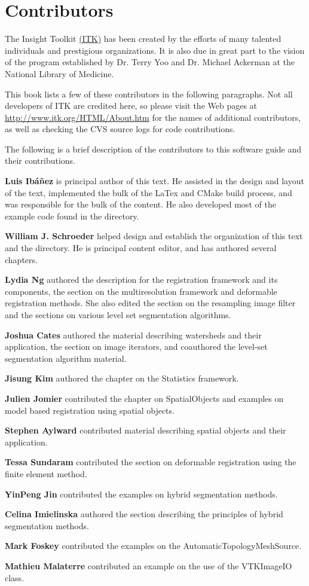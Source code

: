 \chapter*{Contributors}
\noindent

The Insight Toolkit \href{http://www.itk.org}{(ITK)} has been created by the
efforts of many talented individuals and prestigious organizations. It is also
due in great part to the vision of the program established by Dr. Terry Yoo
and Dr. Michael Ackerman at the National Library of Medicine.

This book lists a few of these contributors in the following paragraphs. Not
all developers of ITK are credited here, so please visit the Web pages at
\href{http://www.itk.org/HTML/About.htm}{http://www.itk.org/HTML/About.htm} 
for the names of additional contributors, as well as checking the CVS source
logs for code contributions.

The following is a brief description of the contributors to this software
guide and their contributions.

{\bf Luis Ib\'{a}\~{n}ez} is principal author of this text.
He assisted in the design and layout of the text, implemented the bulk of
the LaTex and CMake build process, and was responsible for the bulk of 
the content. He also developed most of the example code found in the
 directory.

{\bf William J. Schroeder} helped design and establish the organization 
of this text and the  directory. He is principal 
content editor, and has authored several chapters.

{\bf Lydia Ng} authored the description for the registration framework and
its components, the section on the multiresolution framework and deformable
registration methods. She also edited the section on the resampling image
filter and the sections on various level set segmentation algorithms.

{\bf Joshua Cates} authored the material describing watersheds and their
application, the section on image iterators, and coauthored the level-set 
segmentation algorithm material.

{\bf Jisung Kim} authored the chapter on the Statistics framework.

{\bf Julien Jomier} contributed the chapter on SpatialObjects and examples on
model based registration using spatial objects.

{\bf Stephen Aylward}  contributed material describing spatial objects and
their application.

{\bf Tessa Sundaram} contributed the section on deformable registration using
the finite element method.

{\bf YinPeng Jin} contributed the examples on  hybrid segmentation methods. 

{\bf Celina Imielinska} authored the section describing the principles of
hybrid segmentation methods.

{\bf Mark Foskey} contributed the examples on the AutomaticTopologyMeshSource.

{\bf Mathieu Malaterre} contributed an example on the use of the VTKImageIO class.



